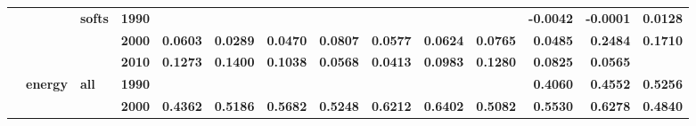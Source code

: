 \documentclass[
  authoryear,
  preprint,
  3p]{elsarticle}
\begin{document}
\begin{landscape}
\begin{longtable}[t]{>{}l>{}l>{}l>{}l>{}r>{}r>{}r>{}r>{}r>{}r>{}r>{}r>{}r>{}r}
\addlinespace
\textbf{} & \textbf{} & \textbf{softs} & \textbf{1990} & \textcolor[HTML]{4285f4}{\textbf{}} & \textcolor[HTML]{4285f4}{\textbf{}} & \textcolor[HTML]{4285f4}{\textbf{}} & \textcolor[HTML]{4285f4}{\textbf{}} & \textcolor[HTML]{4285f4}{\textbf{}} & \textcolor[HTML]{4285f4}{\textbf{}} & \textcolor[HTML]{4285f4}{\textbf{}} & \textcolor[HTML]{4285f4}{\textbf{-0.0042}} & \textcolor[HTML]{4285f4}{\textbf{-0.0001}} & \textcolor[HTML]{4285f4}{\textbf{0.0128}}\\
\textbf{} & \textbf{} & \textbf{} & \textbf{2000} & \textcolor[HTML]{4285f4}{\textbf{0.0603}} & \textcolor[HTML]{4285f4}{\textbf{0.0289}} & \textcolor[HTML]{4285f4}{\textbf{0.0470}} & \textcolor[HTML]{4285f4}{\textbf{0.0807}} & \textcolor[HTML]{4285f4}{\textbf{0.0577}} & \textcolor[HTML]{4285f4}{\textbf{0.0624}} & \textcolor[HTML]{4285f4}{\textbf{0.0765}} & \textcolor[HTML]{4285f4}{\textbf{0.0485}} & \textcolor[HTML]{4285f4}{\textbf{0.2484}} & \textcolor[HTML]{4285f4}{\textbf{0.1710}}\\
\textbf{} & \textbf{} & \textbf{} & \textbf{2010} & \textcolor[HTML]{4285f4}{\textbf{0.1273}} & \textcolor[HTML]{4285f4}{\textbf{0.1400}} & \textcolor[HTML]{4285f4}{\textbf{0.1038}} & \textcolor[HTML]{4285f4}{\textbf{0.0568}} & \textcolor[HTML]{4285f4}{\textbf{0.0413}} & \textcolor[HTML]{4285f4}{\textbf{0.0983}} & \textcolor[HTML]{4285f4}{\textbf{0.1280}} & \textcolor[HTML]{4285f4}{\textbf{0.0825}} & \textcolor[HTML]{4285f4}{\textbf{0.0565}} & \textcolor[HTML]{4285f4}{\textbf{}}\\
\textbf{} & \textbf{energy} & \textbf{all} & \textbf{1990} & \textcolor[HTML]{4285f4}{\textbf{}} & \textcolor[HTML]{4285f4}{\textbf{}} & \textcolor[HTML]{4285f4}{\textbf{}} & \textcolor[HTML]{4285f4}{\textbf{}} & \textcolor[HTML]{4285f4}{\textbf{}} & \textcolor[HTML]{4285f4}{\textbf{}} & \textcolor[HTML]{4285f4}{\textbf{}} & \textcolor[HTML]{4285f4}{\textbf{0.4060}} & \textcolor[HTML]{4285f4}{\textbf{0.4552}} & \textcolor[HTML]{4285f4}{\textbf{0.5256}}\\
\textbf{} & \textbf{} & \textbf{} & \textbf{2000} & \textcolor[HTML]{4285f4}{\textbf{0.4362}} & \textcolor[HTML]{4285f4}{\textbf{0.5186}} & \textcolor[HTML]{4285f4}{\textbf{0.5682}} & \textcolor[HTML]{4285f4}{\textbf{0.5248}} & \textcolor[HTML]{4285f4}{\textbf{0.6212}} & \textcolor[HTML]{4285f4}{\textbf{0.6402}} & \textcolor[HTML]{4285f4}{\textbf{0.5082}} & \textcolor[HTML]{4285f4}{\textbf{0.5530}} & \textcolor[HTML]{4285f4}{\textbf{0.6278}} & \textcolor[HTML]{4285f4}{\textbf{0.4840}}\\

\end{longtable}
\end{landscape}
\end{document}
